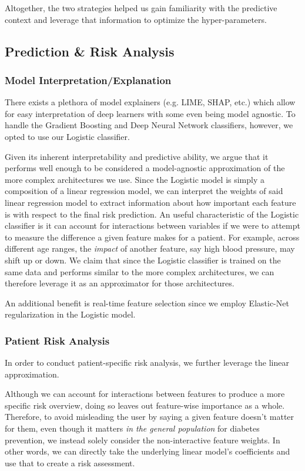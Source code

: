 \documentclass[conference]{IEEEtran}
\begin{document}
        Altogether, the two strategies helped us gain familiarity with the predictive context and leverage that information to optimize the hyper-parameters.

    \subsection{Prediction \& Risk Analysis}
        \subsubsection{Model Interpretation/Explanation}
        There exists a plethora of model explainers (e.g. LIME, SHAP, etc.) which allow for easy interpretation of deep learners with some even being model agnostic. To handle the Gradient Boosting and Deep Neural Network classifiers, however, we opted to use our Logistic classifier.

        Given its inherent interpretability and predictive ability, we argue that it performs well enough to be considered a model-agnostic approximation of the more complex architectures we use. Since the Logistic model is simply a composition of a linear regression model, we can interpret the weights of said linear regression model to extract information about how important each feature is with respect to the final risk prediction. An useful characteristic of the Logistic classifier is it can account for interactions between variables if we were to attempt to measure the difference a given feature makes for a patient. For example, across different age ranges, the \textit{impact} of another feature, say high blood pressure, may shift up or down. We claim that since the Logistic classifier is trained on the same data and performs similar to the more complex architectures, we can therefore leverage it as an approximator for those architectures.

        An additional benefit is real-time feature selection since we employ Elastic-Net regularization in the Logistic model.

        \subsubsection{Patient Risk Analysis}
        In order to conduct patient-specific risk analysis, we further leverage the linear approximation.

        Although we can account for interactions between features to produce a more specific risk overview, doing so leaves out feature-wise importance as a whole. Therefore, to avoid misleading the user by saying a given feature doesn't matter for them, even though it matters \textit{in the general population} for diabetes prevention, we instead solely consider the non-interactive feature weights. In other words, we can directly take the underlying linear model's coefficients and use that to create a risk assessment.
\end{document}
